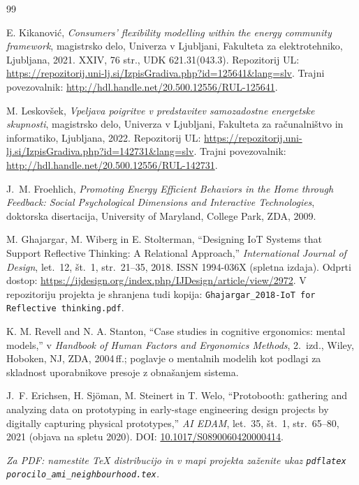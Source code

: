 \documentclass[a4paper,11pt]{article}
\begin{document}
\begin{thebibliography}{99}

E. Kikanović,
\textit{Consumers' flexibility modelling within the energy community framework},
magistrsko delo, Univerza v Ljubljani, Fakulteta za elektrotehniko, Ljubljana, 2021.
\newblock XXIV, 76 str., UDK 621.31(043.3).
\newblock Repozitorij UL: \url{https://repozitorij.uni-lj.si/IzpisGradiva.php?id=125641&lang=slv}.
\newblock Trajni povezovalnik: \url{http://hdl.handle.net/20.500.12556/RUL-125641}.

M. Leskovšek,
\textit{Vpeljava poigritve v predstavitev samozadostne energetske skupnosti},
magistrsko delo, Univerza v Ljubljani, Fakulteta za računalništvo in informatiko, Ljubljana, 2022.
\newblock Repozitorij UL: \url{https://repozitorij.uni-lj.si/IzpisGradiva.php?id=142731&lang=slv}.
\newblock Trajni povezovalnik: \url{http://hdl.handle.net/20.500.12556/RUL-142731}.

J.~M. Froehlich,
\textit{Promoting Energy Efficient Behaviors in the Home through Feedback: Social Psychological Dimensions and Interactive Technologies},
doktorska disertacija, University of Maryland, College Park, ZDA, 2009.

M. Ghajargar, M. Wiberg in E. Stolterman,
``Designing IoT Systems that Support Reflective Thinking: A Relational Approach,''
\textit{International Journal of Design}, let.\ 12, št.\ 1, str.\ 21--35, 2018.
\newblock ISSN 1994-036X (spletna izdaja).
\newblock Odprti dostop: \url{https://ijdesign.org/index.php/IJDesign/article/view/2972}.
\newblock V repozitoriju projekta je shranjena tudi kopija: \texttt{Ghajargar\_2018-IoT for Reflective thinking.pdf}.

K. M. Revell and N. A. Stanton,
``Case studies in cognitive ergonomics: mental models,'' v
\textit{Handbook of Human Factors and Ergonomics Methods}, 2.\ izd., Wiley, Hoboken, NJ, ZDA, 2004\,ff.; poglavje o mentalnih modelih kot podlagi za skladnost uporabnikove presoje z obnašanjem sistema.

J.~F. Erichsen, H. Sjöman, M. Steinert in T. Welo,
``Protobooth: gathering and analyzing data on prototyping in early-stage engineering design projects by digitally capturing physical prototypes,''
\textit{AI EDAM}, let.\ 35, št.\ 1, str.\ 65--80, 2021 (objava na spletu 2020).
\newblock DOI: \href{https://doi.org/10.1017/S0890060420000414}{10.1017/S0890060420000414}.

\end{thebibliography}

\vspace{0.6em}
\noindent\textit{Za PDF: namestite TeX distribucijo in v mapi projekta zaženite ukaz \texttt{pdflatex porocilo\_ami\_neighbourhood.tex}.}
\end{document}
